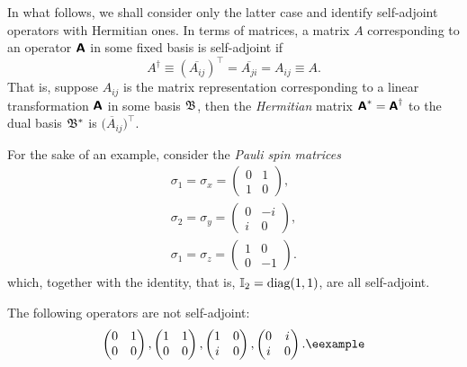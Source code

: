 In what follows, we shall consider only the latter case and identify self-adjoint operators with Hermitian ones.
In terms of matrices, a matrix $A$ corresponding to an operator $\textsf{\textbf{A}}$ in
some fixed basis is self-adjoint
if
\begin{equation}
A^{\dagger}\equiv (\overline{A_{ij}})^\intercal =  \overline{A_{ji}} =A_{ij} \equiv A.
\end{equation}
That is, suppose $A_{ij}$ is the matrix representation
corresponding to a linear transformation $\textsf{\textbf{A}}$  in some basis ${\frak B}$,
then the {\em Hermitian} matrix $\textsf{\textbf{A}}^\ast = \textsf{\textbf{A}}^\dagger$
to the dual basis
${\frak B}^\ast $
is
$\overline{(A_{ij}})^\intercal $.



{\color{blue}
\bexample
For the sake of an example, consider the
{\em Pauli spin matrices}
\begin{equation}
\begin{split}
\sigma_1=\sigma_x=
\begin{pmatrix}
0&1\\
1&0
\end{pmatrix}
,   \\
\sigma_2=\sigma_y=
\begin{pmatrix}
0&-i\\
i&0
\end{pmatrix}
,   \\
\sigma_1=\sigma_z=
\begin{pmatrix}
1&0\\
0&-1
\end{pmatrix}
.
\end{split}
\end{equation}
which, together with the identity, that is, ${\Bbb I}_2=\textrm{diag}(1,1)$,  are all self-adjoint.

The following operators are not self-adjoint:
\begin{equation}
\begin{pmatrix}
0&1\\
0&0
\end{pmatrix}
 ,
\begin{pmatrix}
1&1\\
0&0
\end{pmatrix}
,
\begin{pmatrix}
1&0\\
i&0
\end{pmatrix}
,
\begin{pmatrix}
0&i\\
i&0
\end{pmatrix}
.{\textrm{\eexample}}
\end{equation}
%
}

